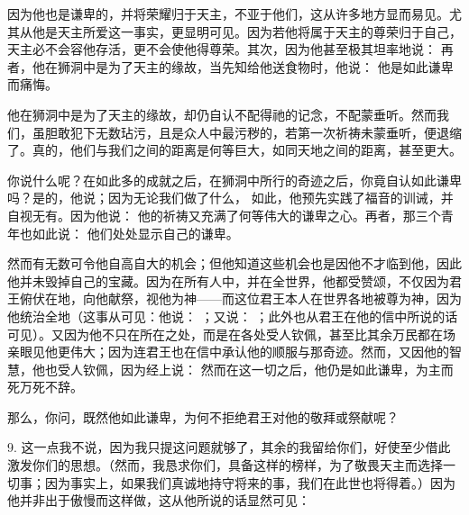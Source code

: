 因为他也是谦卑的，并将荣耀归于天主，不亚于他们，这从许多地方显而易见。尤其从他是天主所爱这一事实，更显明可见。因为若他将属于天主的尊荣归于自己，天主必不会容他存活，更不会使他得尊荣。其次，因为他甚至极其坦率地说：  再者，他在狮洞中是为了天主的缘故，当先知给他送食物时，他说：  他是如此谦卑而痛悔。\par

他在狮洞中是为了天主的缘故，却仍自认不配得祂的记念，不配蒙垂听。然而我们，虽胆敢犯下无数玷污，且是众人中最污秽的，若第一次祈祷未蒙垂听，便退缩了。真的，他们与我们之间的距离是何等巨大，如同天地之间的距离，甚至更大。\par

你说什么呢？在如此多的成就之后，在狮洞中所行的奇迹之后，你竟自认如此谦卑吗？是的，他说；因为无论我们做了什么，  如此，他预先实践了福音的训诫，并自视无有。因为他说： 他的祈祷又充满了何等伟大的谦卑之心。再者，那三个青年也如此说：  他们处处显示自己的谦卑。\par

然而有无数可令他自高自大的机会；但他知道这些机会也是因他不才临到他，因此他并未毁掉自己的宝藏。因为在所有人中，并在全世界，他都受赞颂，不仅因为君王俯伏在地，向他献祭，视他为神——而这位君王本人在世界各地被尊为神，因为他统治全地（这事从可见：他说： ；又说： ；此外也从君王在他的信中所说的话可见）。又因为他不只在所在之处，而是在各处受人钦佩，甚至比其余万民都在场亲眼见他更伟大；因为连君王也在信中承认他的顺服与那奇迹。然而，又因他的智慧，他也受人钦佩，因为经上说：  然而在这一切之后，他仍是如此谦卑，为主而死万死不辞。\par

那么，你问，既然他如此谦卑，为何不拒绝君王对他的敬拜或祭献呢？\par

9. 这一点我不说，因为我只提这问题就够了，其余的我留给你们，好使至少借此激发你们的思想。（然而，我恳求你们，具备这样的榜样，为了敬畏天主而选择一切事；因为事实上，如果我们真诚地持守将来的事，我们在此世也将得着。）因为他并非出于傲慢而这样做，这从他所说的话显然可见： \par

